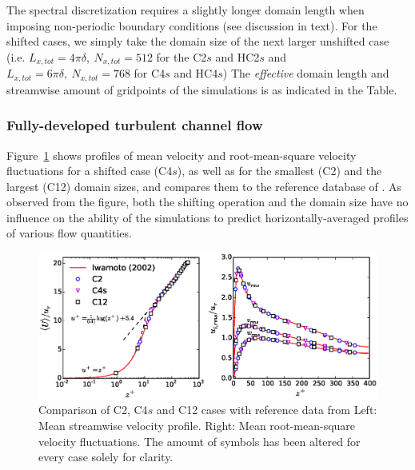 \begin{table}
\begin{threeparttable}
			\begin{tablenotes}
				\small 
				\item The spectral discretization requires a slightly longer domain length when imposing non-periodic boundary conditions (see discussion in text). For the shifted cases, we simply take the domain size of the next larger unshifted case (i.e. $L_{x,tot} = 4\pi\delta,~N_{x,tot} = 512$  for the C2$s$ and HC2$s$ and $L_{x,tot} = 6\pi\delta,~N_{x,tot} = 768$ for C4$s$ and HC4$s$) The \emph{effective} domain length and streamwise amount of gridpoints of the simulations is as indicated in the Table.
			\end{tablenotes}
		
			\end{threeparttable}
			
		\end{table}
	
		\subsubsection{Fully-developed turbulent channel flow}
		Figure~\ref{fig:validation} shows profiles of mean velocity and root-mean-square velocity fluctuations for a shifted case (C4$s$), as
		well as for the smallest (C2) and the largest (C12) domain sizes, and compares them to the reference database of
		\cite{iwamoto2002reynolds}. As observed from the figure, both the shifting operation and the domain size have no influence on the ability of the simulations to predict horizontally-averaged profiles of various flow quantities. 
		
		\begin{figure}
			\centering
			\includegraphics[width=\textwidth,trim= 0cm 0.35cm 0cm 0.3cm,clip]{chapters/turbulent_inflow/spbc/figure3}
			\caption{Comparison of C2, C4$s$ and C12 cases with reference data from \cite{iwamoto2002reynolds} Left: Mean streamwise velocity profile. Right: Mean root-mean-square velocity fluctuations. The amount of symbols has been altered for every case solely for clarity.}
			\label{fig:validation}
		\end{figure}
		
